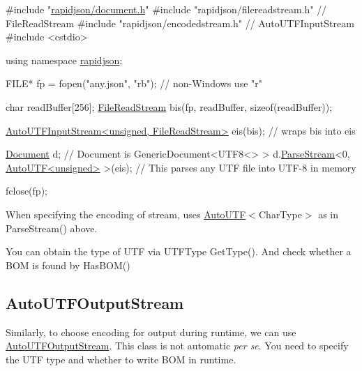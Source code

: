 \begin{DoxyCode}
\textcolor{preprocessor}{#include "\hyperlink{document_8h}{rapidjson/document.h}"}
\textcolor{preprocessor}{#include "rapidjson/filereadstream.h"}   \textcolor{comment}{// FileReadStream}
\textcolor{preprocessor}{#include "rapidjson/encodedstream.h"}    \textcolor{comment}{// AutoUTFInputStream}
\textcolor{preprocessor}{#include <cstdio>}

\textcolor{keyword}{using namespace }\hyperlink{namespacerapidjson}{rapidjson};

FILE* fp = fopen(\textcolor{stringliteral}{"any.json"}, \textcolor{stringliteral}{"rb"}); \textcolor{comment}{// non-Windows use "r"}

\textcolor{keywordtype}{char} readBuffer[256];
\hyperlink{class_file_read_stream}{FileReadStream} bis(fp, readBuffer, \textcolor{keyword}{sizeof}(readBuffer));

\hyperlink{class_auto_u_t_f_input_stream}{AutoUTFInputStream<unsigned, FileReadStream>} eis(bis);  \textcolor{comment}{//
       wraps bis into eis}

\hyperlink{class_generic_document}{Document} d;         \textcolor{comment}{// Document is GenericDocument<UTF8<> > }
d.\hyperlink{class_generic_document_afe94c0abc83a20f2d7dc1ba7677e6238}{ParseStream}<0, \hyperlink{struct_auto_u_t_f}{AutoUTF<unsigned>} >(eis); \textcolor{comment}{// This parses any UTF file into
       UTF-8 in memory}

fclose(fp);
\end{DoxyCode}


When specifying the encoding of stream, uses {\ttfamily \hyperlink{struct_auto_u_t_f}{Auto\+U\+TF}$<$Char\+Type$>$} as in {\ttfamily Parse\+Stream()} above.

You can obtain the type of U\+TF via {\ttfamily U\+T\+F\+Type Get\+Type()}. And check whether a B\+OM is found by {\ttfamily Has\+B\+O\+M()}\hypertarget{md_Cadriciel_Commun_Externe_RapidJSON_doc_stream.zh-cn_AutoUTFOutputStream}{}\subsection{Auto\+U\+T\+F\+Output\+Stream}\label{md_Cadriciel_Commun_Externe_RapidJSON_doc_stream.zh-cn_AutoUTFOutputStream}
Similarly, to choose encoding for output during runtime, we can use {\ttfamily \hyperlink{class_auto_u_t_f_output_stream}{Auto\+U\+T\+F\+Output\+Stream}}. This class is not automatic {\itshape per se}. You need to specify the U\+TF type and whether to write B\+OM in runtime.


